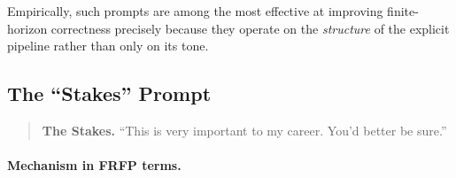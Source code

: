 Empirically, such prompts are among the most effective at improving
finite-horizon correctness precisely because they operate on the
\emph{structure} of the explicit pipeline rather than only on its tone.

\subsection{The ``Stakes'' Prompt}

\begin{quote}
\textbf{The Stakes.} ``This is very important to my career. You'd better
be sure.''
\end{quote}

\paragraph{Mechanism in FRFP terms.}

